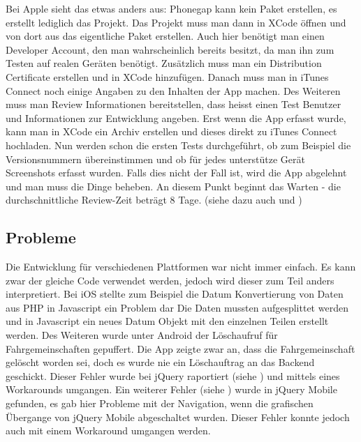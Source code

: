 Bei Apple sieht das etwas anders aus: Phonegap kann kein Paket erstellen, es erstellt lediglich das Projekt. Das Projekt muss man dann in XCode öffnen und von dort aus das eigentliche Paket erstellen. Auch hier benötigt man einen Developer Account, den man wahrscheinlich bereits besitzt, da man ihn zum Testen auf realen Geräten benötigt. Zusätzlich muss man ein Distribution Certificate erstellen und in XCode hinzufügen. Danach muss man in iTunes Connect noch einige Angaben zu den Inhalten der App machen. Des Weiteren muss man Review Informationen bereitstellen, dass heisst einen Test Benutzer und Informationen zur Entwicklung angeben. Erst wenn die App erfasst wurde, kann man in XCode ein Archiv erstellen und dieses direkt zu iTunes Connect hochladen. Nun werden schon die ersten Tests durchgeführt, ob zum Beispiel die Versionsnummern übereinstimmen und ob für jedes unterstütze Gerät Screenshots erfasst wurden. Falls dies nicht der Fall ist, wird die App abgelehnt und man muss die Dinge beheben. An diesem Punkt beginnt das Warten - die durchschnittliche Review-Zeit beträgt 8 Tage. (siehe dazu auch \cite{apple_prov_apple} und \cite{apple_prov_ralf})

\subsection{Probleme}
Die Entwicklung für verschiedenen Plattformen war nicht immer einfach. Es kann zwar der gleiche Code verwendet werden, jedoch wird dieser zum Teil anders interpretiert. Bei iOS stellte zum Beispiel die Datum Konvertierung von Daten aus PHP in Javascript ein Problem dar Die Daten mussten aufgesplittet werden und in Javascript ein neues Datum Objekt mit den einzelnen Teilen erstellt werden. Des Weiteren wurde unter Android der Löschaufruf für Fahrgemeinschaften gepuffert. Die App zeigte zwar an, dass die Fahrgemeinschaft gelöscht worden sei, doch es wurde nie ein Löschauftrag an das Backend geschickt. Dieser Fehler wurde bei jQuery raportiert (siehe \cite{bug_jquery}) und mittels eines Workarounds umgangen. Ein weiterer Fehler (siehe \cite{bug_jquery_mobile}) wurde in jQuery Mobile gefunden, es gab hier Probleme mit der Navigation, wenn die grafischen Übergange von jQuery Mobile abgeschaltet wurden. Dieser Fehler konnte jedoch auch mit einem Workaround umgangen werden.
